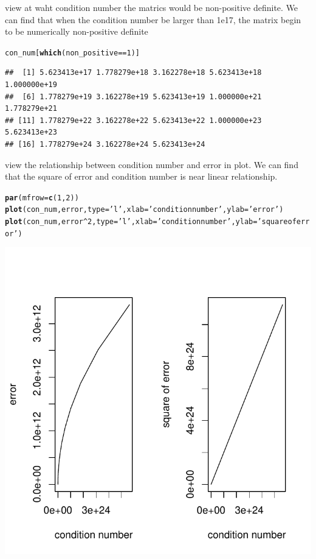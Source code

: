 \documentclass{article}\usepackage[]{graphicx}\usepackage[]{color}
\makeatletter
\def\maxwidth{ %
  \ifdim\Gin@nat@width>\linewidth
    \linewidth
  \else
    \Gin@nat@width
  \fi
}
\newcommand{\hlnum}[1]{\textcolor[rgb]{0.686,0.059,0.569}{#1}}%
\newcommand{\hlstr}[1]{\textcolor[rgb]{0.192,0.494,0.8}{#1}}%
\newcommand{\hlopt}[1]{\textcolor[rgb]{0,0,0}{#1}}%
\newcommand{\hlstd}[1]{\textcolor[rgb]{0.345,0.345,0.345}{#1}}%
\newcommand{\hlkwc}[1]{\textcolor[rgb]{0.333,0.667,0.333}{#1}}%
\newcommand{\hlkwd}[1]{\textcolor[rgb]{0.737,0.353,0.396}{\textbf{#1}}}%
\newenvironment{kframe}{%
 \def\at@end@of@kframe{}%
 \ifinner\ifhmode%
  \def\at@end@of@kframe{\end{minipage}}%
  \begin{minipage}{\columnwidth}%
 \fi\fi%
 \def\FrameCommand##1{\hskip\@totalleftmargin \hskip-\fboxsep
 \colorbox{shadecolor}{##1}\hskip-\fboxsep
     \hskip-\linewidth \hskip-\@totalleftmargin \hskip\columnwidth}%
 \MakeFramed {\advance\hsize-\width
   \@totalleftmargin\z@ \linewidth\hsize
   \@setminipage}}%
 {\par\unskip\endMakeFramed%
 \at@end@of@kframe}
\newenvironment{knitrout}{}{} %
\makeatother
\begin{document}
view at waht condition number the matrics would be non-positive definite. We can find that when the condition number be larger than 1e17, the matrix begin to be numerically non-positive definite
\begin{knitrout}
\color{fgcolor}\begin{kframe}
\begin{alltt}
\hlstd{con_num[}\hlkwd{which}\hlstd{(non_positive}\hlopt{==}\hlnum{1}\hlstd{)]}
\end{alltt}
\begin{verbatim}
##  [1] 5.623413e+17 1.778279e+18 3.162278e+18 5.623413e+18 1.000000e+19
##  [6] 1.778279e+19 3.162278e+19 5.623413e+19 1.000000e+21 1.778279e+21
## [11] 1.778279e+22 3.162278e+22 5.623413e+22 1.000000e+23 5.623413e+23
## [16] 1.778279e+24 3.162278e+24 5.623413e+24
\end{verbatim}
\end{kframe}
\end{knitrout}
view the relationship between condition number and error in plot. We can find that the square of error and condition number  is near linear relationship. 
\begin{knitrout}
\color{fgcolor}\begin{kframe}
\begin{alltt}
\hlkwd{par}\hlstd{(}\hlkwc{mfrow}\hlstd{=}\hlkwd{c}\hlstd{(}\hlnum{1}\hlstd{,}\hlnum{2}\hlstd{))}
\hlkwd{plot}\hlstd{(con_num,error,}\hlkwc{type}\hlstd{=}\hlstr{'l'}\hlstd{,}\hlkwc{xlab}\hlstd{=}\hlstr{'condition number'}\hlstd{,}\hlkwc{ylab}\hlstd{=}\hlstr{'error'}\hlstd{)}
\hlkwd{plot}\hlstd{(con_num,error}\hlopt{^}\hlnum{2}\hlstd{,}\hlkwc{type}\hlstd{=}\hlstr{'l'}\hlstd{,}\hlkwc{xlab}\hlstd{=}\hlstr{'condition number'}\hlstd{,}\hlkwc{ylab}\hlstd{=}\hlstr{'square of error'}\hlstd{)}
\end{alltt}
\end{kframe}
\includegraphics[width=\maxwidth]{figure/rchunk-6-1} 

\end{knitrout}
\end{document}
